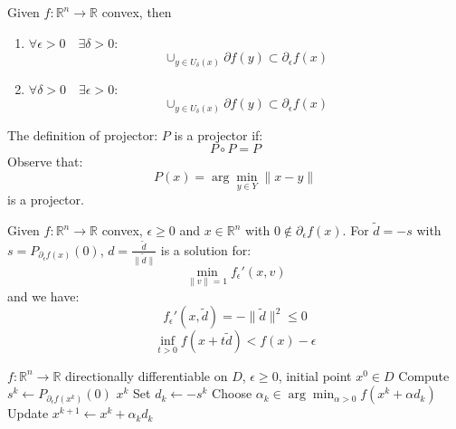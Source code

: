 \begin{theorem}
Given $f: \mathbb{R}^n \rightarrow \mathbb{R}$ convex, then 
\begin{enumerate}
	\item $\forall \epsilon > 0 \quad \exists \delta > 0$:
	\begin{equation*}
		\cup_{y \in U_\delta(x)} \partial f(y) \subset \partial_\epsilon f(x)
	\end{equation*}
	\item $\forall \delta > 0 \quad \exists \epsilon > 0$:
	\begin{equation*}
		\cup_{y \in U_\delta(x)} \partial f(y) \subset \partial_\epsilon f(x)
	\end{equation*}
\end{enumerate}
\end{theorem}

The definition of projector: $P$ is a projector if:
\begin{equation*}
	P \circ P = P
\end{equation*}
Observe that:
\begin{equation*}
	P(x) = \arg \min_{y \in Y} \| x - y \|
\end{equation*}
is a projector.


\begin{theorem}
Given $f: \mathbb{R}^n \rightarrow \mathbb{R}$ convex, $\epsilon \geq 0$ and $ x \in \mathbb{R}^n$ with $0 \notin \partial_\epsilon f(x)$. For $\tilde{d} = -s$ with $s = P_{\partial_\epsilon f(x)} (0)$, $d = \frac{\tilde{d}}{\|\tilde{d}\|}$ is a solution for:
\begin{equation*}
	\min_{\|v\| = 1} f_\epsilon'(x, v)
\end{equation*}
and we have:
\begin{equation*}
	f_\epsilon'(x, \tilde{d}) = - \|\tilde{d}\|^2 \leq 0
\end{equation*}
\begin{equation*}
	\inf_{t > 0} f(x + t\tilde{d}) < f(x) - \epsilon
\end{equation*}
\end{theorem}

\begin{algorithm}
\caption{$\epsilon$-subdifferential algorithm}
\begin{algorithmic}[1]
\Require $f:\mathbb{R}^n\to\mathbb{R}$ directionally differentiable on $D$, $\epsilon\ge 0$, initial point $x^0\in D$
  \State Compute $s^k \gets P_{\partial_\epsilon f(x^k)}(0)$
    \State \Return $x^k$
  \EndIf
  \State Set $d_k \gets -s^k$
  \State Choose $\alpha_k \in \arg\min_{\alpha>0} f(x^k + \alpha d_k)$
  \State Update $x^{k+1} \gets x^k + \alpha_k d_k$
\EndFor
\end{algorithmic}
\end{algorithm}

